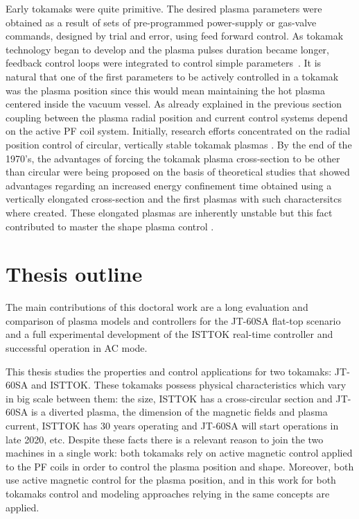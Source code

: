 Early tokamaks were quite primitive. The desired plasma parameters were obtained as a result of sets of pre-programmed power-supply or gas-valve commands, designed by trial and error, using feed forward control. As  tokamak technology began to develop and the plasma pulses duration became longer, feedback control loops were integrated to control simple parameters~\cite{Lister1999}. It is natural that one of the first parameters to be actively controlled in a tokamak was the plasma position since this would mean maintaining the hot plasma centered inside the vacuum vessel. As already explained in the previous section coupling between the plasma radial position and current control systems depend on the active PF coil system. Initially, research efforts concentrated on the radial position control of circular, vertically stable tokamak plasmas \cite[Chapter~1]{PirontiBook}. By the end of the 1970's, the advantages of forcing the tokamak plasma cross-section to be other than circular  were being proposed on the basis of theoretical studies that showed advantages regarding  an increased energy confinement time  obtained using a vertically elongated cross-section and the first plasmas with such charactersitcs where created. These elongated  plasmas are inherently unstable but this fact contributed to master the shape plasma control \cite[Chapter~1]{PirontiBook}. \smallskip



\section{Thesis outline}

The main contributions of this doctoral work  are a long  evaluation and comparison of plasma models and controllers for the  JT-60SA flat-top scenario and  a full experimental  development of the ISTTOK real-time controller and successful operation in AC mode. 

This thesis studies the properties and control applications for two tokamaks: JT-60SA and ISTTOK. These tokamaks possess physical characteristics which vary in big scale between them: the size, ISTTOK has a cross-circular section and JT-60SA is a diverted plasma, the dimension of the magnetic fields and plasma current, ISTTOK has 30 years operating and JT-60SA will start operations in late 2020, etc. Despite these facts there is a relevant reason to join the two machines in a single work: both tokamaks rely on active magnetic control applied to the PF coils in order to control the plasma position and shape. Moreover, both use active magnetic control for the plasma position, and in this work for both tokamaks control and modeling approaches relying in the same concepts are applied.   \smallskip

